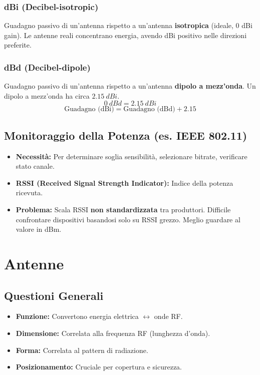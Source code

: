 \subsubsection{dBi (Decibel-isotropic)}
Guadagno passivo di un'antenna rispetto a un'antenna \textbf{isotropica} (ideale, 0 dBi gain). Le antenne reali concentrano energia, avendo dBi positivo nelle direzioni preferite.

\subsubsection{dBd (Decibel-dipole)}
Guadagno passivo di un'antenna rispetto a un'antenna \textbf{dipolo a mezz'onda}.
Un dipolo a mezz'onda ha circa $\SI{2.15}{dBi}$.
\[ \SI{0}{dBd} = \SI{2.15}{dBi} \]
\[ \text{Guadagno (dBi)} = \text{Guadagno (dBd)} + 2.15 \]

\subsection{Monitoraggio della Potenza (es. IEEE 802.11)}
\begin{itemize}
    \item \textbf{Necessità:} Per determinare soglia sensibilità, selezionare bitrate, verificare stato canale.
    \item \textbf{RSSI (Received Signal Strength Indicator):} Indice della potenza ricevuta.
    \item \textbf{Problema:} Scala RSSI \textbf{non standardizzata} tra produttori. Difficile confrontare dispositivi basandosi solo su RSSI grezzo. Meglio guardare al valore in dBm.
\end{itemize}

\section{Antenne}

\subsection{Questioni Generali}
\begin{itemize}
    \item \textbf{Funzione:} Convertono energia elettrica $\leftrightarrow$ onde RF.
    \item \textbf{Dimensione:} Correlata alla frequenza RF (lunghezza d'onda).
    \item \textbf{Forma:} Correlata al pattern di radiazione.
    \item \textbf{Posizionamento:} Cruciale per copertura e sicurezza.
\end{itemize}

